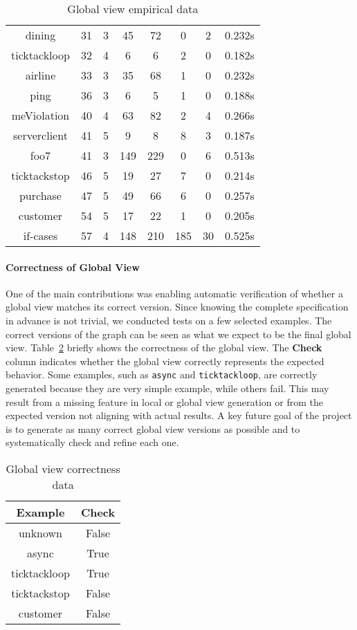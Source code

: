 \begin{table}[!ht]
\begin{tabular}{|c|c|c|c|c|c|c|c|}
dining & 31 & 3 & 45 & 72 & 0 & 2 & 0.232s \\ 
ticktackloop & 32 & 4 & 6 & 6 & 2 & 0 & 0.182s \\ 
airline & 33 & 3 & 35 & 68 & 1 & 0 & 0.232s \\ 
ping & 36 & 3 & 6 & 5 & 1 & 0 & 0.188s \\ 
meViolation & 40 & 4 & 63 & 82 & 2 & 4 & 0.266s \\ 
serverclient & 41 & 5 & 9 & 8 & 8 & 3 & 0.187s \\ 
foo7 & 41 & 3 & 149 & 229 & 0 & 6 & 0.513s \\ 
ticktackstop & 46 & 5 & 19 & 27 & 7 & 0 & 0.214s \\ 
purchase & 47 & 5 & 49 & 66 & 6 & 0 & 0.257s \\ 
customer & 54 & 5 & 17 & 22 & 1 & 0 & 0.205s \\ 
if-cases & 57 & 4 & 148 & 210 & 185 & 30 & 0.525s \\ 
\hline
\end{tabular}
\caption{Global view empirical data}
\label{tab:gvbench}
\end{table}

\paragraph{Correctness of Global View}
One of the main contributions was enabling automatic verification of whether a
global view matches its correct version. Since knowing the complete specification
in advance is not trivial, we conducted tests on a few selected examples. 
The correct versions of the graph can be seen as what we expect to be the final
global view.
Table~\ref{tab:corrbench} briefly shows the correctness of the global view. 
The \textbf{Check} column indicates whether the global view 
correctly represents the expected behavior. Some examples, such as 
\texttt{async} and \texttt{ticktackloop}, are correctly generated because they 
are very simple example, while others fail. This may result from a missing 
feature in local or global view generation or from
the expected version not aligning with actual results. A key future goal of the
project is to generate as many correct global view versions as possible and to
systematically check and refine each one.

\begin{table}[!ht]
\centering
\begin{tabular}{|c|c|}
\hline
Example & Check \\ 
\hline
unknown & False \\ 
async & True \\ 
ticktackloop & True \\ 
ticktackstop & False \\ 
customer & False \\ 
\hline
\end{tabular}
\caption{Global view correctness data}
\label{tab:corrbench}
\end{table}

